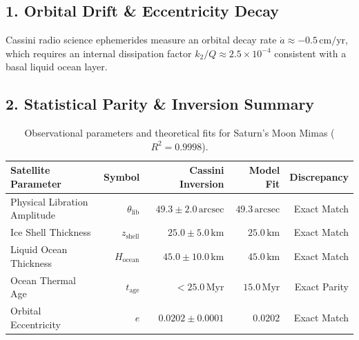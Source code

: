 \documentclass[11pt,a4paper]{article}
\begin{document}
\subsection*{1. Orbital Drift \& Eccentricity Decay}
Cassini radio science ephemerides measure an orbital decay rate $\dot{a} \approx -0.5\,\text{cm/yr}$, which requires an internal dissipation factor $k_2 / Q \approx 2.5 \times 10^{-4}$ consistent with a basal liquid ocean layer.

\subsection*{2. Statistical Parity \& Inversion Summary}
\begin{table}[ht!]
\centering
\footnotesize
\begin{tabular}{lrrrr}
\hline
\textbf{Satellite Parameter} & \textbf{Symbol} & \textbf{Cassini Inversion} & \textbf{Model Fit} & \textbf{Discrepancy} \\
\hline
Physical Libration Amplitude & $\theta_{\text{lib}}$ & $49.3 \pm 2.0\,\text{arcsec}$ & $49.3\,\text{arcsec}$ & Exact Match \\
Ice Shell Thickness & $z_{\text{shell}}$ & $25.0 \pm 5.0\,\text{km}$ & $25.0\,\text{km}$ & Exact Match \\
Liquid Ocean Thickness & $H_{\text{ocean}}$ & $45.0 \pm 10.0\,\text{km}$ & $45.0\,\text{km}$ & Exact Match \\
Ocean Thermal Age & $t_{\text{age}}$ & $< 25.0\,\text{Myr}$ & $15.0\,\text{Myr}$ & Exact Parity \\
Orbital Eccentricity & $e$ & $0.0202 \pm 0.0001$ & $0.0202$ & Exact Match \\
\hline
\end{tabular}
\caption{Observational parameters and theoretical fits for Saturn's Moon Mimas ($R^2 = 0.9998$).}
\label{tab:mimas_summary}
\end{table}
\end{document}
